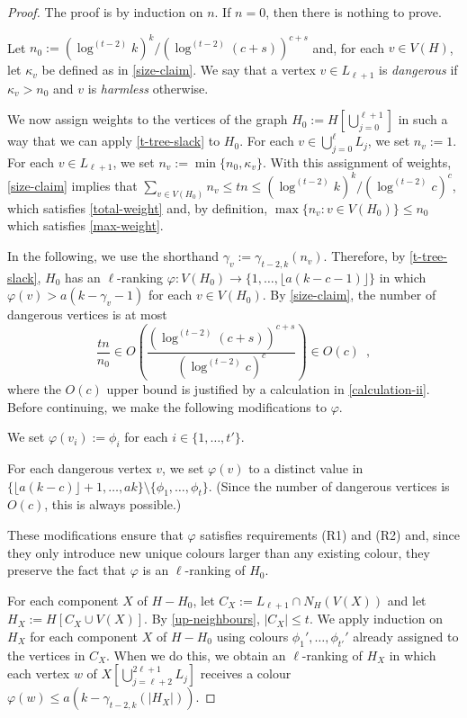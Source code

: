 \documentclass[kpfonts]{patmorin}
\newcommand{\defin}[1]{\emph{\color{brightmaroon}#1}}
\theoremstyle{named}
\begin{document}
\begin{proof}
    The proof is by induction on $n$. If $n=0$, then there is nothing to prove.

    Let $n_0:=(\log^{(t-2)} k)^k/(\log^{(t-2)} (c+s))^{c+s}$ and, for each $v\in V(H)$, let $\kappa_v$ be defined as in \cref{size-claim}.  We say that a vertex $v\in L_{\ell+1}$ is \defin{dangerous} if $\kappa_v>n_0$ and $v$ is \defin{harmless} otherwise.

    We now assign weights to the vertices of the graph $H_0:=H[\bigcup_{j=0}^{\ell+1}]$ in such a way that we can apply \cref{t-tree-slack} to $H_0$.  For each $v\in\bigcup_{j=0}^\ell L_j$, we set $n_v:=1$.  For each $v\in L_{\ell+1}$, we set $n_v := \min\{n_0, \kappa_v\}$.  With this assignment of weights, \cref{size-claim} implies that $\sum_{v\in V(H_0)} n_v\le tn \le (\log^{(t-2)} k)^k/(\log^{(t-2)} c)^c$, which satisfies \cref{total-weight} and, by definition, $\max\{n_v:v\in V(H_0)\}\le n_0$ which satisfies \cref{max-weight}.

    In the following, we use the shorthand $\gamma_v := \gamma_{t-2,k}(n_v)$.    Therefore, by \cref{t-tree-slack}, $H_{0}$ has an $\ell$-ranking $\varphi:V(H_0)\to\{1,\ldots,\lfloor a(k-c-1)\rfloor\}$ in which $\varphi(v)> a(k-\gamma_v-1)$ for each $v\in V(H_0)$.
    By \cref{size-claim}, the number of dangerous vertices is at most
    \[
        \frac{tn}{n_0} \in O\left(\frac{(\log^{(t-2)} (c+s))^{c+s}}{(\log^{(t-2)} c)^c}\right) \in O(c) \enspace ,
    \]
    where the $O(c)$ upper bound is justified by a calculation in \cref{calculation-ii}.
    Before continuing, we make the following modifications to $\varphi$.

    \begin{compactenum}
        \item We set $\varphi(v_i):=\phi_i$ for each $i\in\{1,\ldots,t'\}$.
        \item For each dangerous vertex $v$, we set $\varphi(v)$ to a distinct value in $\{\lfloor a(k-c)\rfloor+1,\ldots,ak\}\setminus\{\phi_1,\ldots,\phi_t\}$. (Since the number of dangerous vertices is $O(c)$, this is always possible.)
    \end{compactenum}
    These modifications ensure that $\varphi$ satisfies requirements (R1) and (R2) and, since they only introduce new unique colours larger than any existing colour, they preserve the fact that $\varphi$ is an $\ell$-ranking of $H_0$.

    For each component $X$ of $H-H_0$, let $C_X:=L_{\ell+1}\cap N_H(V(X))$ and let $H_X:=H[C_X\cup V(X)]$.  By \cref{up-neighbours}, $|C_X|\le t$. We apply induction on $H_X$ for each component $X$ of $H-H_0$ using colours $\phi_1',\ldots,\phi_{t'}'$ already assigned to the vertices in $C_X$.
    When we do this, we obtain an $\ell$-ranking of $H_X$ in which each vertex $w$ of $X[\bigcup_{j=\ell+2}^{2\ell+1} L_j]$ receives a colour $\varphi(w) \le a(k-\gamma_{t-2,k}(|H_X|))$.


\end{proof}
\end{document}
